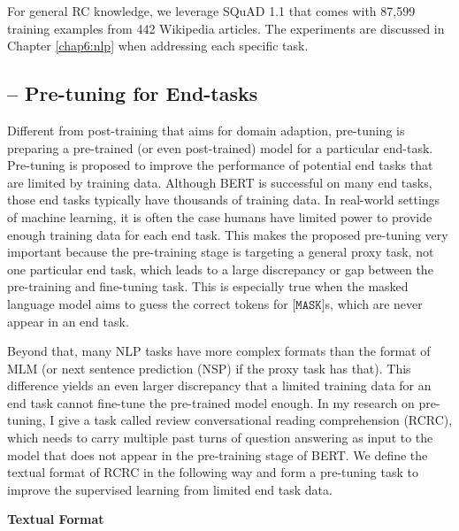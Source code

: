 For general RC knowledge, we leverage SQuAD 1.1 \cite{rajpurkar2016squad} that comes with 87,599 training examples from 442 Wikipedia articles.
The experiments are discussed in Chapter \ref{chap6:nlp} when addressing each specific task.

\subsection{-- Pre-tuning for End-tasks}
\label{chap4:sec:pre-tuning}

Different from post-training that aims for domain adaption, pre-tuning is preparing a pre-trained (or even post-trained) model for a particular end-task.
Pre-tuning is proposed to improve the performance of potential end tasks that are limited by training data.
Although BERT is successful on many end tasks, those end tasks typically have thousands of training data.
In real-world settings of machine learning, it is often the case humans have limited power to provide enough training data for each end task.
This makes the proposed pre-tuning very important because the pre-training stage is targeting a general proxy task, not one particular end task, which leads to a large discrepancy or gap between the pre-training and fine-tuning task.
This is especially true when the masked language model aims to guess the correct tokens for $\texttt{[MASK]}$s, which are never appear in an end task.

Beyond that, many NLP tasks have more complex formats than the format of MLM (or next sentence prediction (NSP) if the proxy task has that).
This difference yields an even larger discrepancy that a limited training data for an end task cannot fine-tune the pre-trained model enough.
In my research on pre-tuning, I give a task called review conversational reading comprehension (RCRC), which needs to carry multiple past turns of question answering as input to the model that does not appear in the pre-training stage of BERT.
We define the textual format of RCRC in the following way and form a pre-tuning task to improve the supervised learning from limited end task data.

\textbf{Textual Format}
\label{chap4:sec:format}

